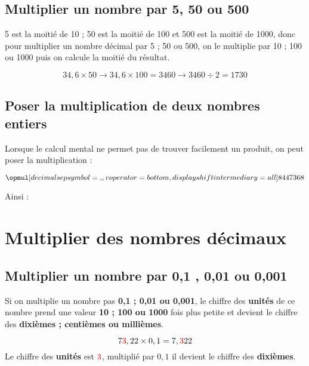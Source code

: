 \documentclass[a4paper,dvipsnames]{article}
\begin{document}
\subsection{Multiplier un nombre par 5, 50 ou 500}

\begin{Mt}
5 est la moitié de 10 ; 50 est la moitié de 100 et 500 est la moitié de 1000, donc pour multiplier un nombre décimal par 5 ; 50 ou 500, on le multiplie par 10 ; 100 ou 1000 puis on calcule la moitié du résultat.\\
\end{Mt}

\begin{Ex}
 \[34,6\times50\rightarrow34,6\times100=3460
 \rightarrow3460\div2=1730\]
\end{Ex}

\subsection{Poser la multiplication de deux nombres entiers}

Lorsque le calcul mental ne permet pas de trouver facilement un produit, on peut poser la multiplication :

\begin{Ex}
\[\opmul[decimalsepsymbol={,},
voperator=bottom,
displayshiftintermediary=all]{8447}{368}\]

Ainsi : 
\end{Ex}

\section{Multiplier des nombres décimaux}

\subsection{Multiplier un nombre par 0,1 , 0,01 ou 0,001}

\begin{Mt}
Si on multiplie un nombre pas \textbf{0,1 ; 0,01 ou 0,001}, le chiffre des \textbf{unités} de ce nombre prend une valeur \textbf{10 ; 100 ou 1000} fois plus petite et devient le chiffre des \textbf{dixièmes ; centièmes ou millièmes}.
\end{Mt}

\begin{Ex}
\[7\textcolor{red}{3},22\times0,1=7,\textcolor{red}{3}22\]
Le chiffre des \textbf{unités} est $\textcolor{red}{3}$, multiplié par $0,1$ il devient le chiffre des \textbf{dixièmes}.
\end{Ex} 
\end{document}
